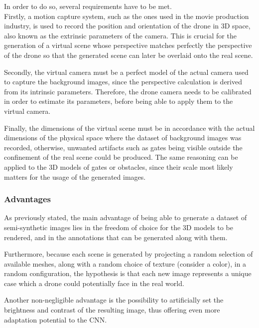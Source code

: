 In order to do so, several requirements have to be met.\\

Firstly, a motion capture system, such as the ones used in the movie production
industry, is used to record the position and orientation of the drone in 3D
space, also known as the extrinsic parameters of the camera. This is crucial
for the generation of a virtual scene whose perspective matches perfectly the
perspective of the drone so that the generated scene can later be overlaid
onto the real scene.

Secondly, the virtual camera must be a perfect model of the actual camera used
to capture the background images, since the perspective calculation is derived
from its intrinsic parameters. Therefore, the drone camera needs to be
calibrated in order to estimate its parameters, before being able to apply
them to the virtual camera.

Finally, the dimensions of the virtual scene must be in accordance with the
actual dimensions of the physical space where the dataset of background images
was recorded, otherwise, unwanted artifacts such as gates being visible outside
the confinement of the real scene could be produced. The same reasoning can be
applied to the 3D models of gates or obstacles, since their scale most likely
matters for the usage of the generated images.\\

	\subsubsection{Advantages}

As previously stated, the main advantage of being able to generate a dataset of
semi-synthetic images lies in the freedom of choice for the 3D models to be
rendered, and in the annotations that can be generated along with them.

Furthermore, because each scene is generated by projecting a random selection
of available meshes, along with a random choice of texture (consider a color),
in a random configuration, the hypothesis is that each new image represents a
unique case which a drone could potentially face in the real world.

Another non-negligible  advantage is the possibility to artificially set the
brightness and contrast of the resulting image, thus offering even more
adaptation potential to the CNN.\\


